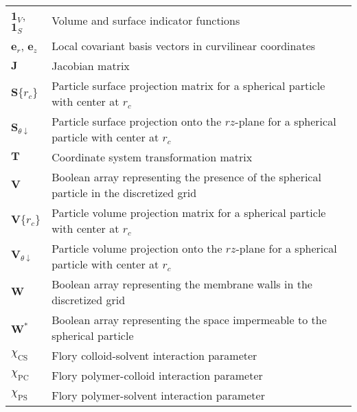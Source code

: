 \documentclass[10pt, a4paper]{article}
\begin{document}
\begin{tabularx}{\linewidth}{l X}
    $\bm{1}_{V}$, $\bm{1}_{S}$ & Volume and surface indicator functions \\
    $\bm{e}_r$, $\bm{e}_z$ & Local covariant basis vectors in curvilinear coordinates \\
    $\bm{J}$ & Jacobian matrix \\
    $\bm{S}\{r_{c}\}$ & Particle surface projection matrix for a spherical particle with center at $r_{c}$ \\
    $\bm{S}_{\theta\downarrow}$ & Particle surface projection onto the $rz$-plane for a spherical particle with center at $r_{c}$ \\
    $\bm{T}$ & Coordinate system transformation matrix \\
    $\bm{V}$ & Boolean array representing the presence of the spherical particle in the discretized grid \\
    $\bm{V}\{r_{c}\}$ & Particle volume projection matrix for a spherical particle with center at $r_{c}$ \\
    $\bm{V}_{\theta\downarrow}$ & Particle volume projection onto the $rz$-plane for a spherical particle with center at $r_{c}$ \\
    $\bm{W}$ & Boolean array representing the membrane walls in the discretized grid \\
    $\bm{W}^{\ast}$ & Boolean array representing the space impermeable to the spherical particle \\
    $\chi_{\textrm{CS}}$ & Flory colloid-solvent interaction parameter \\
    $\chi_{\textrm{PC}}$ & Flory polymer-colloid interaction parameter \\
    $\chi_{\textrm{PS}}$ & Flory polymer-solvent interaction parameter \\
\end{tabularx}

\printbibliography
\end{document}
